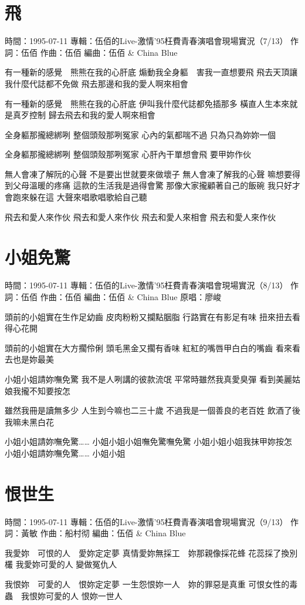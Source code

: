\documentclass[UTF8,a4paper,oneside,twocolumn,12pt]{ctexbook}
\newcommand{\infopair}[2]{\textbullet #1：#2}
\newcommand{\zc}[1][伍佰]{\infopair{作詞}{#1}}
\newcommand{\zq}[1][伍佰]{\infopair{作曲}{#1}}
\newcommand{\bq}[1][伍佰]{\infopair{編曲}{#1}}
\newcommand{\zj}[1]{\infopair{專輯}{#1}}
\newcommand{\yc}[1]{\infopair{原唱}{#1}}
\newcommand{\sj}[1]{\infopair{時間}{#1}}
\newenvironment{info}{\begin{flushleft}\kaishu
	}
	{\end{flushleft}\normalsize\yahei\par}
\newenvironment{lyric}{
	}
{}
\begin{document}
\section{飛}
\begin{info}
	\sj{1995-07-11}
	\zj{伍佰的Live-激情'95枉費青春演唱會現場實況（7/13）}
	\zc
	\zq
	\bq[伍佰 \& China Blue]
\end{info}
\begin{lyric}
	有一種新的感覺　熊熊在我的心肝底
	煽動我全身軀　害我一直想要飛
	飛去天頂讓我什麼代誌都不免做
	飛去那邊和我的愛人啊來相會

	有一種新的感覺　熊熊在我的心肝底
	伊叫我什麼代誌都免插那多
	橫直人生本來就是真歹控制
	歸去飛去和我的愛人啊來相會

	全身軀那攏總綁咧
	整個頭殼那咧冤家
	心內的氣都喘不過
	只為只為妳妳一個

	全身軀那攏總綁咧
	整個頭殼那咧冤家
	心肝內干單想會飛
	要甲妳作伙

	無人會凍了解阮的心聲
	不是要出世就要來做壞子
	無人會凍了解我的心聲
	嘛想要得到父母溫暖的疼痛
	這款的生活我是過得會驚
	那像大家攏顧著自己的飯碗
	我只好才會跑來躲在這
	大聲來唱歌唱歌給自己聽

	飛去和愛人來作伙
	飛去和愛人來作伙
	飛去和愛人來相會
	飛去和愛人來作伙
\end{lyric}

\section{小姐免驚}
\begin{info}
	\sj{1995-07-11}
	\zj{伍佰的Live-激情'95枉費青春演唱會現場實況（8/13）}
	\zc
	\zq
	\bq[伍佰 \& China Blue]
	\yc{廖峻}
\end{info}
\begin{lyric}
	頭前的小姐實在生作足幼齒
	皮肉粉粉又攔點胭脂
	行路實在有影足有味
	扭來扭去看得心花開

	頭前的小姐實在大方擱伶俐
	頭毛黑金又擱有香味
	紅紅的嘴唇甲白白的嘴齒
	看來看去也是妳最美

	小姐小姐請妳嘸免驚
	我不是人咧講的彼款流氓
	平常時雖然我真愛臭彈
	看到美麗姑娘我攏不知要按怎

	雖然我冊是讀無多少
	人生到今嘛也二三十歲
	不過我是一個善良的老百姓
	飲酒了後我嘛未黑白花

	小姐小姐請妳嘸免驚……
	小姐小姐小姐嘸免驚嘸免驚
	小姐小姐小姐我抹甲妳按怎
	小姐小姐請妳嘸免驚……
	小姐小姐
\end{lyric}

\section{恨世生}
\begin{info}
	\sj{1995-07-11}
	\zj{伍佰的Live-激情'95枉費青春演唱會現場實況（9/13）}
	\zc[黃敏]
	\zq[船村彻]
	\bq[伍佰 \& China Blue]
\end{info}
\begin{lyric}
	我愛妳　可恨的人　愛妳定定夢
	真情愛妳無採工　妳那親像採花蜂
	花蕊採了換別欉 我愛妳可愛的人
	變做冤仇人

	我恨妳　可愛的人　恨妳定定夢
	一生怨恨妳一人　妳的罪惡是真重
	可恨女性的毒蟲　我恨妳可愛的人
	恨妳一世人
\end{lyric}
\end{document}
